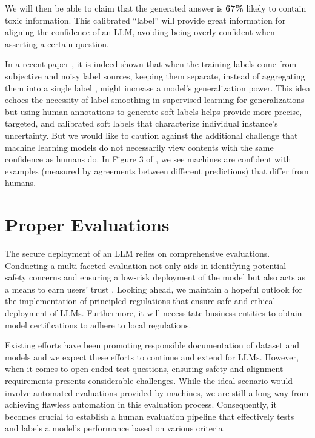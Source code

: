 \documentclass{article}
\begin{document}
We will then be able to claim that the generated answer is \textbf{67\%} likely to contain toxic information. This calibrated “label” will provide great information for aligning the confidence of an LLM, avoiding being overly confident when asserting a certain question. 

In a recent paper \cite{wei2022aggregate}, it is indeed shown that when the training labels come from subjective and noisy label sources, keeping them separate, instead of aggregating them into a single label \cite{sig15,shah:sigmetrics13,shah:nips13}, might increase a model’s generalization power. This idea echoes the necessity of label smoothing \cite{muller2019does,wei2022smooth} in supervised learning for generalizations but using human annotations to generate soft labels helps provide more precise, targeted, and calibrated soft labels that characterize individual instance’s uncertainty. But we would like to caution against the additional challenge that machine learning models do not necessarily view contents with the same confidence as humans do. In Figure 3 of \cite{liu2023humans}, we see machines are confident with examples (measured by agreements between different predictions) that differ from humans. 

\section{Proper Evaluations}

The secure deployment of an LLM relies on comprehensive evaluations. Conducting a multi-faceted evaluation not only aids in identifying potential safety concerns and ensuring a low-risk deployment of the model but also acts as a means to earn users' trust \cite{papenmeier2019model}. Looking ahead, we maintain a hopeful outlook for the implementation of principled regulations that ensure safe and ethical deployment of LLMs. Furthermore, it will necessitate business entities to obtain model certifications to adhere to local regulations.



Existing efforts have been promoting responsible documentation of dataset \cite{gebru2021datasheets} and models \cite{mitchell2019model} and we expect these efforts to continue and extend for LLMs. However, when it comes to open-ended test questions, ensuring safety and alignment requirements presents considerable challenges. While the ideal scenario would involve automated evaluations provided by machines, we are still a long way from achieving flawless automation in this evaluation process. Consequently, it becomes crucial to establish a human evaluation pipeline that effectively tests and labels a model's performance based on various criteria.
\end{document}
